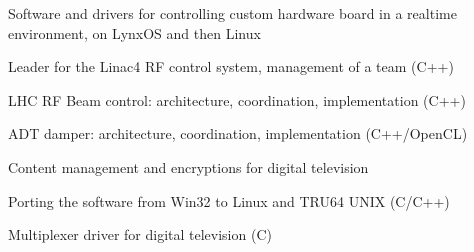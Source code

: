\documentclass[a4paper]{deedy-resume} %
\begin{document}
\begin{minipage}[t]{0.66\textwidth}

	Software and drivers for controlling custom hardware board in a realtime
    environment, on LynxOS and then Linux
	\begin{tightitemize}
		\item Leader for the Linac4 RF control system, management of a team (C++)
		\item LHC RF Beam control: architecture, coordination, implementation (C++)
		\item ADT damper: architecture, coordination, implementation (C++/OpenCL)
	\end{tightitemize}

\sectionspace %


	Content management and encryptions for digital television
	\begin{tightitemize}
		\item Porting the software from Win32 to Linux and TRU64 UNIX (C/C++)
		\item Multiplexer driver for digital television (C)
	\end{tightitemize}

\sectionspace %


%

\end{minipage}%
\hfill

\end{document}
